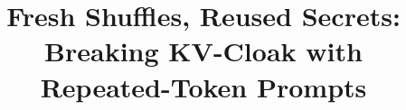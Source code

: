 \documentclass[conference,compsoc]{IEEEtran}
\begin{document}
\title{Fresh Shuffles, Reused Secrets:\\Breaking KV-Cloak with Repeated-Token Prompts}
\author{}
\maketitle









\clearpage


\appendices

\end{document}

